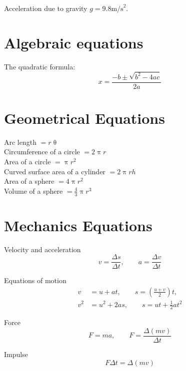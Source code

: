 \documentclass[a4paper,12pt]{book}
\begin{document}
Acceleration due to gravity $g=9.8\text{m/s}^{2}$.\\

\section*{Algebraic equations}

The quadratic formula:
\begin{equation*}
x=\frac{-b\pm\sqrt{b^{2}-4ac}}{2a}
\end{equation*}

\section*{Geometrical Equations}

Arc length $=r\uptheta$\\

Circumference of a circle $=2\uppi r$\\

Area of a circle $=\uppi r^{2}$\\

Curved surface area of a cylinder $=2\uppi r h$\\

Area of a sphere $=4\uppi r^{2}$\\

Volume of a sphere $=\frac{4}{3}\uppi r^{3}$\\

\section*{Mechanics Equations}
Velocity and acceleration
\begin{equation*}
v=\frac{\Delta s}{\Delta t}, \qquad a=\frac{\Delta v}{\Delta t}
\end{equation*}

Equations of motion
\begin{align*}
v&=u+at, \qquad s=\left(\frac{u+v}{2}\right)t,\\
v^{2}&=u^{2}+2as, \qquad s=ut+\frac{1}{2}at^{2}
\end{align*}

Force
\begin{equation*}
F=ma, \qquad F=\frac{\Delta\left(mv\right)}{\Delta t}
\end{equation*}

Impulse
\begin{equation*}
F\Delta t =\Delta \left(mv\right)
\end{equation*}
\end{document}
